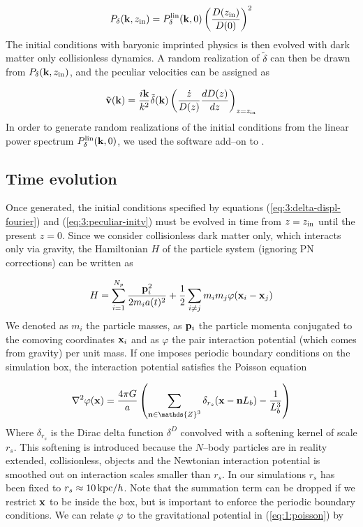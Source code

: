 \begin{equation}
\label{eq:3:hybrid-power}
P_\delta(\mathbf{k},z_{\rm in}) = P^{\rm lin}_\delta(\mathbf{k},0)\left(\frac{D(z_{\rm in})}{D(0)}\right)^2 
\end{equation}
%
The initial conditions with baryonic imprinted physics is then evolved with dark matter only collisionless dynamics. A random realization of $\tilde{\delta}$ can then be drawn from $P_\delta(\mathbf{k},z_{\rm in})$, and the peculiar velocities can be assigned as 

\begin{equation}
\label{eq:3:peculiar-initv}
\tilde{\mathbf{v}}(\mathbf{k}) = \frac{i\mathbf{k}}{k^2}\tilde{\delta}(\mathbf{k})\left(\frac{\dot{z}}{D(z)}\frac{dD(z)}{dz}\right)_{z=z_{\rm in}}
\end{equation}  
%
In order to generate random realizations of the initial conditions from the linear power spectrum $P^{\rm lin}_\delta(\mathbf{k},0)$, we used the  software add--on to  \citep{gadget2}.   

\subsection{Time evolution}
Once generated, the initial conditions specified by equations (\ref{eq:3:delta-displ-fourier}) and (\ref{eq:3:peculiar-initv}) must be evolved in time from $z=z_{\rm in}$ until the present $z=0$. Since we consider collisionless dark matter only, which interacts only via gravity, the Hamiltonian $H$ of the particle system (ignoring PN corrections) can be written as 

\begin{equation}
\label{eq:3:collisionless-ham}
H = \sum_{i=1}^{N_p} \frac{\mathbf{p}_i^2}{2m_i a(t)^2} + \frac{1}{2}\sum_{i\neq j}m_im_j\varphi(\mathbf{x}_i-\mathbf{x}_j)
\end{equation} 
%
We denoted as $m_i$ the particle masses, as $\mathbf{p}_i$ the particle momenta conjugated to the comoving coordinates $\mathbf{x}_i$ and as $\varphi$ the pair interaction potential (which comes from gravity) per unit mass. If one imposes periodic boundary conditions on the simulation box, the interaction potential satisfies the Poisson equation

\begin{equation}
\label{eq:3:part-poisson}
\nabla^2\varphi(\bb{x}) = \frac{4\pi G}{a}\left(\sum_{\bb{n}\in\mathds{Z}^3}\delta_{r_s}(\bb{x}-\bb{n}L_b)-\frac{1}{L_b^3}\right) 
\end{equation}
%
Where $\delta_{r_s}$ is the Dirac delta function $\delta^D$ convolved with a softening kernel of scale $r_s$. This softening is introduced because the $N$--body particles are in reality extended, collisionless, objects and the Newtonian interaction potential is smoothed out on interaction scales smaller than $r_s$. In our simulations $r_s$ has been fixed to $r_s\approx 10\,{\rm kpc}/h$. Note that the summation term can be dropped if we restrict $\mathbf{x}$ to be inside the box, but is important to enforce the periodic boundary conditions. We can relate $\varphi$ to the gravitational potential in (\ref{eq:1:poisson}) by    

